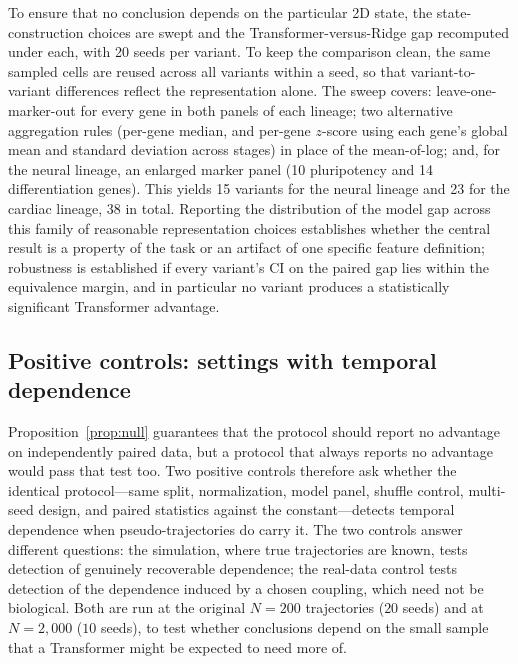 \documentclass[10pt,letterpaper]{article}
\begin{document}
To ensure that no conclusion depends on the particular 2D state, the state-construction choices are swept and the Transformer-versus-Ridge gap recomputed under each, with 20 seeds per variant. To keep the comparison clean, the same sampled cells are reused across all variants within a seed, so that variant-to-variant differences reflect the representation alone. The sweep covers: leave-one-marker-out for every gene in both panels of each lineage; two alternative aggregation rules (per-gene median, and per-gene $z$-score using each gene's global mean and standard deviation across stages) in place of the mean-of-log; and, for the neural lineage, an enlarged marker panel (10 pluripotency and 14 differentiation genes). This yields 15 variants for the neural lineage and 23 for the cardiac lineage, 38 in total. Reporting the distribution of the model gap across this family of reasonable representation choices establishes whether the central result is a property of the task or an artifact of one specific feature definition; robustness is established if every variant's CI on the paired gap lies within the equivalence margin, and in particular no variant produces a statistically significant Transformer advantage.

\subsection*{Positive controls: settings with temporal dependence}
\label{subsec:positive}

Proposition~\ref{prop:null} guarantees that the protocol should report no advantage on independently paired data, but a protocol that always reports no advantage would pass that test too. Two positive controls therefore ask whether the identical protocol---same split, normalization, model panel, shuffle control, multi-seed design, and paired statistics against the constant---detects temporal dependence when pseudo-trajectories do carry it. The two controls answer different questions: the simulation, where true trajectories are known, tests detection of genuinely recoverable dependence; the real-data control tests detection of the dependence induced by a chosen coupling, which need not be biological. Both are run at the original $N=200$ trajectories ($20$ seeds) and at $N=2{,}000$ ($10$ seeds), to test whether conclusions depend on the small sample that a Transformer might be expected to need more of.
\end{document}
